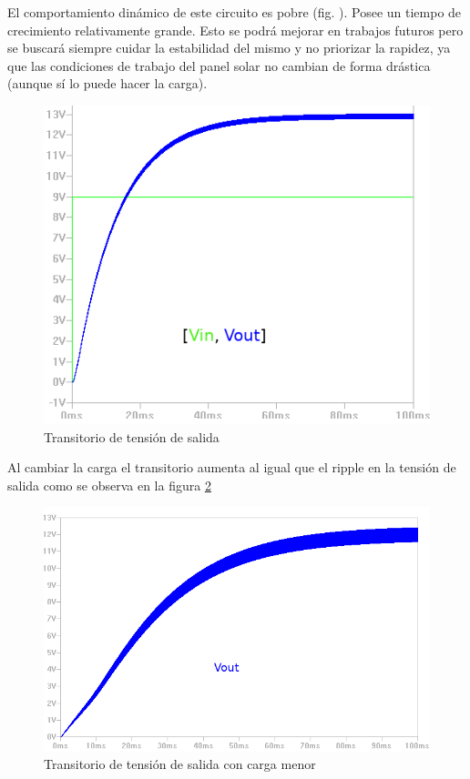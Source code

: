    
    El comportamiento dinámico de este circuito es pobre (fig. ). Posee un tiempo de crecimiento relativamente grande. Esto se podrá mejorar en trabajos futuros pero se buscará siempre cuidar la estabilidad del mismo y no priorizar la rapidez, ya que las condiciones de trabajo del panel solar no cambian de forma drástica (aunque sí lo puede hacer la carga). 
    
    \begin{figure}[htbp]
            \centering
             \includegraphics[scale = 0.3]{Figuras/Transitorio_Vin9V.png}
            \caption{ Transitorio de tensión de salida }
            \label{fig: transitorio Vout}
      \end{figure}
   
   
   Al cambiar la carga el transitorio aumenta al igual que el ripple en la tensión de salida como se observa en la figura \ref{fig: transitorio Vout carga menor}
   
   
     \begin{figure}[htbp]
            \centering
             \includegraphics[scale = 0.27]{Figuras/Vout_R1.png}
            \caption{ Transitorio de tensión de salida con carga menor }
            \label{fig: transitorio Vout carga menor}
      \end{figure}
   
